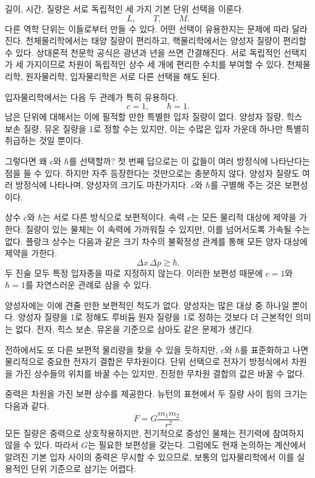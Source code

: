 길이, 시간, 질량은 서로 독립적인 세 가지 기본 단위 선택을 이룬다.
\begin{equation}
L,\qquad T,\qquad M.
\end{equation}
다른 역학 단위는 이들로부터 만들 수 있다. 어떤 선택이 유용한지는 문제에 따라 달라진다. 천체물리학에서는 태양 질량이 편리하고, 핵물리학에서는 양성자 질량이 편리할 수 있다. 상대론적 천문학 공식은 광년과 년을 쓰면 간결해진다. 서로 독립적인 선택지가 세 가지이므로 차원이 독립적인 상수 세 개에 편리한 수치를 부여할 수 있다. 천체물리학, 원자물리학, 입자물리학은 서로 다른 선택을 해도 된다.

입자물리학에서는 다음 두 관례가 특히 유용하다.
\begin{equation}
c=1,
\qquad
\hbar=1.
\end{equation}
남은 단위에 대해서는 이에 필적할 만한 특별한 입자 질량이 없다. 양성자 질량, 힉스 보손 질량, 뮤온 질량을 1로 정할 수는 있지만, 이는 수많은 입자 가운데 하나만 특별히 취급하는 것일 뿐이다.

그렇다면 왜 \(c\)와 \(\hbar\)를 선택할까? 첫 번째 답으로는 이 값들이 여러 방정식에 나타난다는 점을 들 수 있다. 하지만 자주 등장한다는 것만으로는 충분하지 않다. 양성자 질량도 여러 방정식에 나타나며, 양성자의 크기도 마찬가지다. \(c\)와 \(\hbar\)를 구별해 주는 것은 보편성이다.

상수 \(c\)와 \(\hbar\)는 서로 다른 방식으로 보편적이다. 속력 \(c\)는 모든 물리적 대상에 제약을 가한다. 질량이 있는 물체는 이 속력에 가까워질 수 있지만, 이를 넘어서도록 가속될 수는 없다. 플랑크 상수는 다음과 같은 크기 차수의 불확정성 관계를 통해 모든 양자 대상에 제약을 가한다.
\begin{equation}
\Delta x\,\Delta p\gtrsim\hbar.
\end{equation}
두 진술 모두 특정 입자종을 따로 지정하지 않는다. 이러한 보편성 때문에 \(c=1\)와 \(\hbar=1\)를 자연스러운 관례로 삼을 수 있다.

양성자에는 이에 견줄 만한 보편적인 척도가 없다. 양성자는 많은 대상 중 하나일 뿐이다. 양성자 질량을 1로 정해도 루비듐 원자 질량을 1로 정하는 것보다 더 근본적인 의미는 없다. 전자, 힉스 보손, 뮤온을 기준으로 삼아도 같은 문제가 생긴다.

전하에서도 또 다른 보편적 물리량을 찾을 수 있을 듯하지만, \(c\)와 \(\hbar\)를 표준화하고 나면 물리적으로 중요한 전자기 결합은 무차원이다. 단위 선택으로 전자기 방정식에서 차원을 가진 상수들의 위치를 바꿀 수는 있지만, 진정한 무차원 결합의 값은 바꿀 수 없다.

중력은 차원을 가진 보편 상수를 제공한다. 뉴턴의 표현에서 두 질량 사이 힘의 크기는 다음과 같다.
\begin{equation}
F=G\frac{m_1m_2}{r^2}.
\end{equation}
모든 질량은 중력으로 상호작용하지만, 전기적으로 중성인 물체는 전기력에 참여하지 않을 수 있다. 따라서 \(G\)는 필요한 보편성을 갖는다. 그럼에도 현재 논의하는 계산에서 알려진 기본 입자 사이의 중력은 무시할 수 있으므로, 보통의 입자물리학에서 이를 실용적인 단위 기준으로 삼기는 어렵다.


